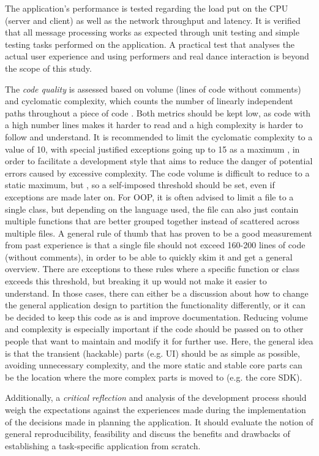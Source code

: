 The application's performance is tested regarding the load put on the \ac{CPU} (server and client) as well as the network throughput and latency.
It is verified that all message processing works as expected through unit testing and simple testing tasks performed on the application.
A practical test that analyses the actual user experience and using performers and real dance interaction is beyond the scope of this study.

The \emph{code quality} is assessed based on volume (lines of code without comments) and cyclomatic complexity, which counts the number of linearly independent paths throughout a piece of code \parencite[see][]{mcCabeComplexity}.
Both metrics should be kept low, as code with a high number lines makes it harder to read and a high complexity is harder to follow and understand.
It is recommended to limit the cyclomatic complexity to a value of 10, with special justified exceptions going up to 15 as a maximum \parencite[15]{testingCyclomaticComplexity}, in order to facilitate a development style that aims to reduce the danger of potential errors caused by excessive complexity.
The code volume is difficult to reduce to a static maximum, but  \parencite[6]{softwareMetricsReliability}, so a self-imposed threshold should be set, even if exceptions are made later on.
For \ac{OOP}, it is often advised to limit a file to a single class, but depending on the language used, the file can also just contain multiple functions that are better grouped together instead of scattered across multiple files.
A general rule of thumb that has proven to be a good measurement from past experience is that a single file should not exceed 160-200 lines of code (without comments), in order to be able to quickly skim it and get a general overview.
There are exceptions to these rules where a specific function or class exceeds this threshold, but breaking it up would not make it easier to understand. In those cases, there can either be a discussion about how to change the general application design to partition the functionality differently, or it can be decided to keep this code as is and improve documentation.
Reducing volume and complexity is especially important if the code should be passed on to other people that want to maintain and modify it for further use. Here, the general idea is that the transient (hackable) parts (e.g. \ac{UI}) should be as simple as possible, avoiding unnecessary complexity, and the more static and stable core parts can be the location where the more complex parts is moved to (e.g. the core \ac{SDK}).

Additionally, a \emph{critical reflection} and analysis of the development process should weigh the expectations against the experiences made during the implementation of the decisions made in planning the application.
It should evaluate the notion of general reproducibility, feasibility and discuss the benefits and drawbacks of establishing a task-specific application from scratch.
